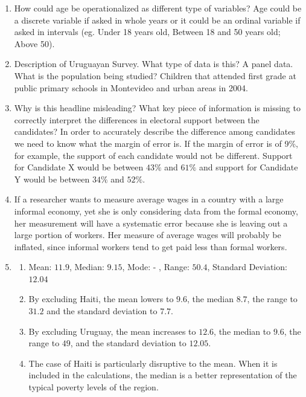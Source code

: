 \documentclass{book}
\begin{document}
\begin{enumerate}
\def\labelenumi{\arabic{enumi}.}
\item
  How could age be operationalized as different type of variables? Age could
  be a discrete variable if asked in whole years or it could be an ordinal
  variable if asked in intervals (eg. Under 18 years old, Between 18 and 50
  years old; Above 50).
\item
  Description of Uruguayan Survey. What type of data is this? A panel data.
  What is the population being studied? Children that attended first grade at
  public primary schools in Montevideo and urban areas in 2004.
\item
  Why is this headline misleading? What key piece of information is missing to
  correctly interpret the differences in electoral support between the
  candidates? In order to accurately describe the difference among candidates
  we need to know what the margin of error is. If the margin of error is of
  9\%, for example, the support of each candidate would not be different.
  Support for Candidate X would be between \(43\%\) and \(61\%\) and support
  for Candidate Y would be between \(34\%\) and \(52\%\).
\item
  If a researcher wants to measure average wages in a country with a large
  informal economy, yet she is only considering data from the formal economy,
  her measurement will have a systematic error because she is leaving out a
  large portion of workers. Her measure of average wages will probably be
  inflated, since informal workers tend to get paid less than formal workers.
\item
  \begin{enumerate}
  \def\labelenumii{\arabic{enumii}.}
  \item
    Mean: \(11.9\), Median: \(9.15\), Mode: - , Range: \(50.4\), Standard
    Deviation: \(12.04\)
  \item
    By excluding Haiti, the mean lowers to \(9.6\), the median \(8.7\), the
    range to \(31.2\) and the standard deviation to \(7.7\).
  \item
    By excluding Uruguay, the mean increases to \(12.6\), the median to
    \(9.6\), the range to \(49\), and the standard deviation to \(12.05\).
  \item
    The case of Haiti is particularly disruptive to the mean. When it is
    included in the calculations, the median is a better representation of the
    typical poverty levels of the region.
  \end{enumerate}

\end{enumerate}
\end{document}
